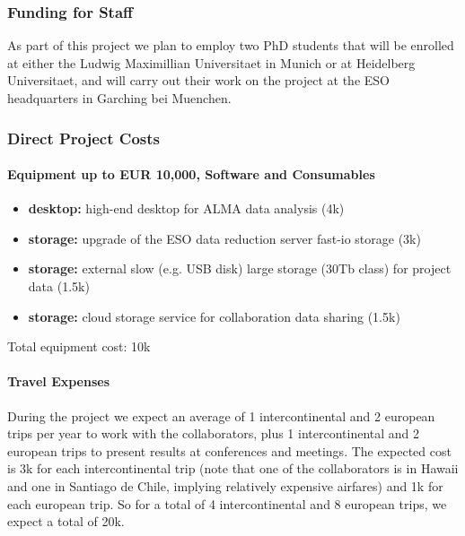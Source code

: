 \documentclass[10pt,fleqn,twoside]{article}
\begin{document}
\subsubsection{Funding for Staff}

As part of this project we plan to employ two PhD students that will be enrolled at either the Ludwig Maximillian Universitaet in Munich or at Heidelberg Universitaet, and will carry out their work on the
project at the ESO headquarters in Garching bei Muenchen.

\todo{[Text]}


\subsubsection{Direct Project Costs}


\paragraph{Equipment up to EUR 10,000, Software and Consumables}

\begin{itemize}
\item {\bf desktop:} high-end desktop for ALMA data analysis (4k\EUR{}) 
\item {\bf storage:} upgrade of the ESO data reduction server fast-io storage (3k\EUR{})
\item {\bf storage:} external slow (e.g. USB disk) large storage (30Tb class) for project data (1.5k\EUR{})
\item {\bf storage:} cloud storage service for collaboration data sharing (1.5k\EUR{})
\end{itemize}

Total equipment cost: 10k\EUR{}  

\paragraph{Travel Expenses}

During the project we expect an average of 1 intercontinental and 2 european
trips per year to work with the collaborators, plus 1 intercontinental and 2
european trips to present results at conferences and meetings. The expected
cost is 3k\EUR{} for each intercontinental trip (note that one of the
collaborators is in Hawaii and one in Santiago de Chile, implying relatively
expensive airfares) and 1k\EUR{} for each european trip. So for a total of
4 intercontinental and 8 european trips, we expect a total of 20k\EUR{}.  \smallskip
\end{document}
